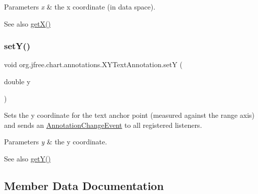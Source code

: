 \begin{DoxyParams}{Parameters}
{\em x} & the x coordinate (in data space).\\
\hline
\end{DoxyParams}
\begin{DoxySeeAlso}{See also}
\mbox{\hyperlink{classorg_1_1jfree_1_1chart_1_1annotations_1_1_x_y_text_annotation_a3d6dc594808c4088b31015658bd7c4f6}{get\+X()}} 
\end{DoxySeeAlso}
\mbox{\label{classorg_1_1jfree_1_1chart_1_1annotations_1_1_x_y_text_annotation_a3d9a4cc0c33eed1ac5e9e9ebd7022c8c}} 
\subsubsection{\texorpdfstring{set\+Y()}{setY()}}
{\footnotesize\ttfamily void org.\+jfree.\+chart.\+annotations.\+X\+Y\+Text\+Annotation.\+setY (\begin{DoxyParamCaption}\item[{double}]{y }\end{DoxyParamCaption})}

Sets the y coordinate for the text anchor point (measured against the range axis) and sends an \mbox{\hyperlink{}{Annotation\+Change\+Event}} to all registered listeners.


\begin{DoxyParams}{Parameters}
{\em y} & the y coordinate.\\
\hline
\end{DoxyParams}
\begin{DoxySeeAlso}{See also}
\mbox{\hyperlink{classorg_1_1jfree_1_1chart_1_1annotations_1_1_x_y_text_annotation_a8c0a7f769617443b23a36b7cdabc6860}{get\+Y()}} 
\end{DoxySeeAlso}


\subsection{Member Data Documentation}
\mbox{\label{classorg_1_1jfree_1_1chart_1_1annotations_1_1_x_y_text_annotation_ad15b4bd6f07424fcf19f20c1d3dcb405}} 
